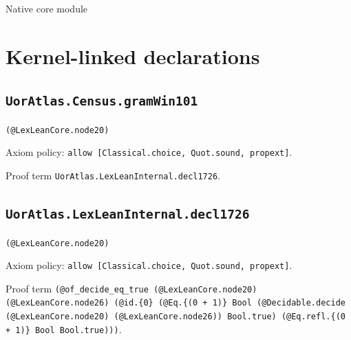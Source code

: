 \documentclass[11pt]{article}
\begin{document}
\begin{center}{\LARGE Native core module}\end{center}
\section*{Kernel-linked declarations}
\subsection*{\texttt{UorAtlas.Census.gramWin101}}
\noindent\texttt{(@LexLeanCore.node20)}\par
\noindent Axiom policy: \texttt{allow [Classical.choice, Quot.sound, propext]}.\par
\noindent Proof term \texttt{UorAtlas.LexLeanInternal.decl1726}.\par
\subsection*{\texttt{UorAtlas.LexLeanInternal.decl1726}}
\noindent\texttt{(@LexLeanCore.node20)}\par
\noindent Axiom policy: \texttt{allow [Classical.choice, Quot.sound, propext]}.\par
\noindent Proof term \texttt{(@of\_decide\_eq\_true (@LexLeanCore.node20) (@LexLeanCore.node26) (@id.\{0\} (@Eq.\{(0 + 1)\} Bool (@Decidable.decide (@LexLeanCore.node20) (@LexLeanCore.node26)) Bool.true) (@Eq.refl.\{(0 + 1)\} Bool Bool.true)))}.\par
\end{document}
